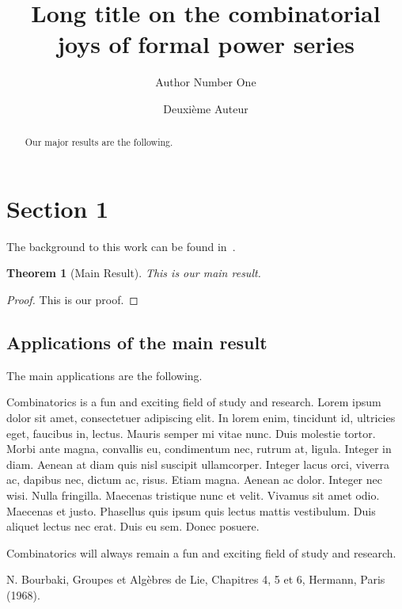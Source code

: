 \documentclass{fpsac}
\author[A. One]{Author Number One}
\author{Deuxi\`eme Auteur}
\title[Combinatorial Joy]{Long title on the combinatorial joys of formal power series}
\newtheorem{theorem}{Theorem}[section]
\theoremstyle{definition}
\theoremstyle{remark}
\numberwithin{equation}{section}
\begin{document}
\begin{abstract}
Our major results are the following.



\end{abstract}

\maketitle  %

\section{Section 1}
The background to this work can be found in~\cite{Bour}.

\begin{theorem}[Main Result] This is our main result.
\end{theorem}

\begin{proof}
This is our proof.
\end{proof}

\subsection{Applications of the main result}
The main applications are the following.

Combinatorics is a fun and exciting field of study and research.
Lorem ipsum dolor sit amet, consectetuer adipiscing elit.  In lorem
enim, tincidunt id, ultricies eget, faucibus in, lectus.  Mauris
semper mi vitae nunc.  Duis molestie tortor.  Morbi ante magna,
convallis eu, condimentum nec, rutrum at, ligula.  Integer in diam.
Aenean at diam quis nisl suscipit ullamcorper.  Integer lacus orci,
viverra ac, dapibus nec, dictum ac, risus.  Etiam magna.  Aenean ac
dolor.  Integer nec wisi.  Nulla fringilla.  Maecenas tristique nunc
et velit.  Vivamus sit amet odio.  Maecenas et justo.  Phasellus quis
ipsum quis lectus mattis vestibulum.  Duis aliquet lectus nec erat.
Duis eu sem.  Donec posuere.




Combinatorics will always remain a fun and exciting field of study and
research.





\begin{thebibliography}{A}

N. Bourbaki,
  Groupes et Alg\`ebres de Lie, Chapitres 4, 5 et 6, Hermann,
  Paris (1968).

\end{thebibliography}
\end{document}
